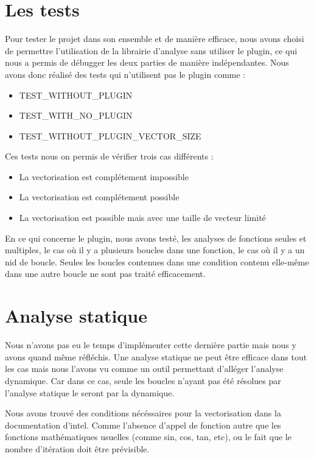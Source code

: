\documentclass[12pt,french]{article}
\begin{document}
\section{\color{blue}Les tests}

Pour tester le projet dans son ensemble et de manière efficace, nous avons choisi de permettre l'utilisation de la librairie d'analyse sans utiliser le plugin, ce qui nous a permis de débugger les deux parties de manière indépendantes. Nous avons donc réalisé des tests qui n'utilisent pas le plugin comme :

\begin{itemize}
\item TEST\_WITHOUT\_PLUGIN
\item TEST\_WITH\_NO\_PLUGIN
\item TEST\_WITHOUT\_PLUGIN\_VECTOR\_SIZE
\end{itemize}

Ces tests nous on permis de vérifier trois cas différents :

\begin{itemize}
\item La vectorisation est complétement impossible
\item La vectorisation est complétement possible
\item La vectorisation est possible mais avec une taille de vecteur limité
\end{itemize}

En ce qui concerne le plugin, nous avons testé, les analyses de fonctions seules et multiples, le cas où il y a plusieurs boucles dans une fonction, le cas où il y a un nid de boucle. Seules les boucles contenues dans une condition contenu elle-même dans une autre boucle ne sont pas traité efficacement.

\section{\color{blue}Analyse statique}

Nous n'avons pas eu le temps d'implémenter cette dernière partie mais nous y avons quand même réfléchis. Une analyse statique ne peut être efficace dans tout les cas mais nous l'avons vu comme un outil permettant d'alléger l'analyse dynamique. Car dans ce cas, seule les boucles n'ayant pas été résolues par l'analyse statique le seront par la dynamique.

Nous avons trouvé des conditions nécéssaires pour la vectorisation dans la documentation d'intel. Comme l'absence d'appel de fonction autre que les fonctions mathématiques usuelles (comme sin, cos, tan, etc), ou le fait que le nombre d'itération doit être prévisible.
\end{document}
